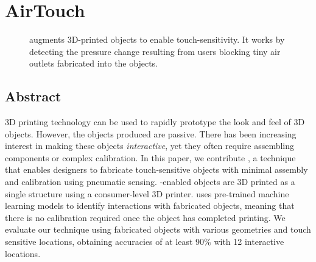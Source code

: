 \chapter{AirTouch}

	\begin{figure}[h]
		\centering
		\label{fig:teaser}

		\caption{\at augments 3D-printed objects to enable touch-sensitivity. It works
			by detecting the pressure change resulting from users blocking tiny air
			outlets fabricated into the objects.}
	\end{figure}

	\section*{Abstract}
		3D printing technology can be used to rapidly prototype the look and feel of
		3D objects. However, the objects produced are passive. There has been
		increasing interest in making these objects \emph{interactive}, yet they
		often require assembling components or complex calibration. In this paper,
		we contribute \emph{\at}, a technique that enables designers to fabricate
		touch-sensitive objects with minimal assembly and calibration using
		pneumatic sensing. \at-enabled objects are 3D printed as a single structure
		using a consumer-level 3D printer. \at uses pre-trained machine learning
		models to identify interactions with fabricated objects, meaning that there
		is no calibration required once the object has completed printing. We
		evaluate our technique using fabricated objects with various geometries and
		touch sensitive locations, obtaining accuracies of at least 90\% with 12
		interactive locations.


